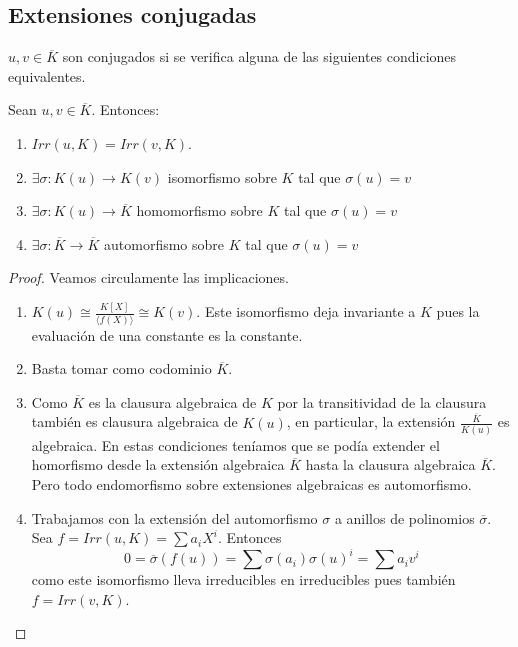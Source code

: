 \subsection{Extensiones conjugadas}

\begin{definition}
$u,v \in \overline{K}$ son conjugados si se verifica alguna de las siguientes condiciones equivalentes.
\end{definition}

\begin{proposition}
Sean $u,v \in \overline{K}$. Entonces:

\begin{enumerate}
\item $Irr(u,K) = Irr(v,K)$. 
\item $\exists \sigma: K(u) \to K(v)$ isomorfismo sobre $K$ tal que $\sigma(u) = v$
\item $\exists \sigma:K(u) \to \overline{K}$ homomorfismo sobre $K$ tal que $\sigma(u) = v$
\item $\exists \sigma:\overline{K} \to \overline{K}$ automorfismo sobre $K$ tal que $\sigma(u)= v$
\end{enumerate}
\end{proposition}
\begin{proof}
Veamos circulamente las implicaciones.

\begin{enumerate}
\item $K(u) \cong \frac{K[X]}{\langle f(X) \rangle} \cong K(v)$. Este isomorfismo deja invariante a $K$ pues la evaluación de una constante es la constante. 
\item Basta tomar como codominio $\overline{K}$.
\item Como $\overline{K}$ es la clausura algebraica de $K$ por la transitividad de la clausura también es clausura algebraica de $K(u)$, en particular, la extensión $\frac{\overline{K}}{K(u)}$ es algebraica. En estas condiciones teníamos que se podía extender el homorfismo desde la extensión algebraica $\overline{K}$ hasta la clausura algebraica $\overline{K}$. Pero todo endomorfismo sobre extensiones algebraicas es automorfismo.
\item Trabajamos con la extensión del automorfismo $\sigma$ a anillos de polinomios $\overline{\sigma}$. Sea $f = Irr(u,K) = \sum a_iX^i$. Entonces $$0 = \overline{\sigma}(f(u)) = \sum \sigma(a_i)\sigma(u)^i = \sum a_i v^i$$ como este isomorfismo lleva irreducibles en irreducibles pues también $f = Irr(v,K)$. 
\end{enumerate}
\end{proof}

